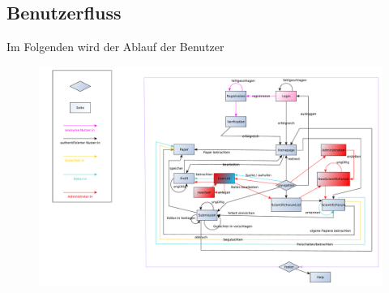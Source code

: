 \subsection{Benutzerfluss}
Im Folgenden wird der Ablauf der Benutzer 
\begin{figure}[H]
    \centering
    \includegraphics[width=\linewidth]{graphics/benutzerFlussyEd}
\end{figure}